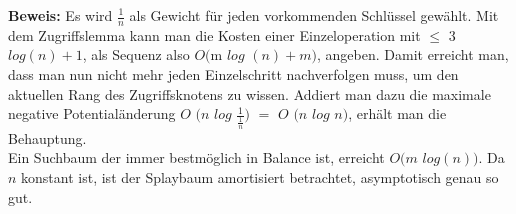 \documentclass[11pt, a4paper]{article}
\begin{document}
\noindent\textbf{Beweis:} 
Es wird $\frac{1}{n}$ als Gewicht für jeden vorkommenden Schlüssel gewählt. Mit dem Zugriffslemma kann man die Kosten einer Einzeloperation mit $\leq$ $3$ $log (n) + 1$, als Sequenz also $O ($m $log$ $(n) +m)$, angeben. Damit erreicht man, dass man nun nicht mehr jeden Einzelschritt nachverfolgen muss, um den aktuellen Rang des Zugriffsknotens zu wissen. Addiert man dazu die maximale negative Potentialänderung $O$ $(n$ $log$ $\frac{1}{\frac{1}{n}})$ $=$ $O$ $(n$ $log$ $n)$, erhält man die Behauptung. \\

\noindent Ein Suchbaum der immer bestmöglich in Balance ist, erreicht $O(m$ $log(n))$. Da $n$ konstant ist, ist der Splaybaum amortisiert betrachtet, asymptotisch genau so gut. 
 
  
  
\end{document}
